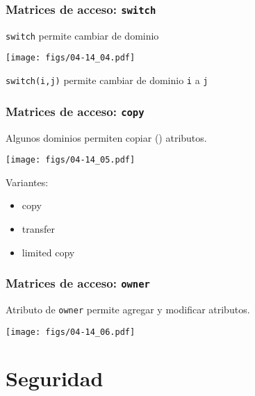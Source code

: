 \documentclass[letter]{beamer}
\begin{document}
\begin{frame}
  \frametitle{Matrices de acceso: {\tt switch}}

  {\tt switch} permite cambiar de dominio

  \begin{center}
    \texttt{[image: figs/04-14\_04.pdf]}
  \end{center}
  
  {\tt switch(i,j)} permite cambiar de dominio {\tt i} a {\tt j}
  
\end{frame}


\begin{frame}
  \frametitle{Matrices de acceso: {\tt copy}}

  Algunos dominios permiten copiar ({\tt *}) atributos.


  \begin{center}
    \texttt{[image: figs/04-14\_05.pdf]}
  \end{center}

  Variantes:
  \begin{itemize}
    \item copy
    \item transfer
    \item limited copy
  \end{itemize}
  
\end{frame}

\begin{frame}
  \frametitle{Matrices de acceso: {\tt owner}}

  Atributo de {\tt owner} permite agregar y modificar atributos.


  \begin{center}
    \texttt{[image: figs/04-14\_06.pdf]}
  \end{center}

  
\end{frame}




\section{Seguridad}
\end{document}
